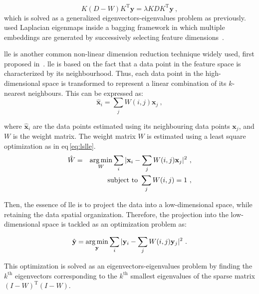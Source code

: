 \begin{equation}
  K (D-W) K^{\text{T}} \mathbf{y} = \lambda K D K^{\text{T}} \mathbf{y} \ ,
  \label{eq:sesmik}
\end{equation}
\noindent which is solved as a generalized eigenvectors-eigenvalues problem as previously.
\citeauthor{Viswanath2011} used Laplacian eigenmaps inside a bagging framework in which multiple embeddings are generated by successively selecting feature dimensions~\cite{Viswanath2011}.

\Ac{lle} is another common non-linear dimension reduction technique widely used, first proposed in~\cite{Roweis2000}.
\ac{lle} is based on the fact that a data point in the feature space is characterized by its neighbourhood.
Thus, each data point in the high-dimensional space is transformed to represent a linear combination of its $k$-nearest neighbours.
This can be expressed as:
\begin{equation}
	\hat{\mathbf{x}}_i = \sum_j W(i,j) \mathbf{x}_j \ ,
	\label{eq:lincomlle}
\end{equation}

\noindent where $\hat{\mathbf{x}}_i$ are the data points estimated using its neighbouring data points $\mathbf{x}_j$, and $W$ is the weight matrix.
The weight matrix $W$ is estimated using a least square optimization as in \acs{eq}\,\eqref{eq:lslle}.
\begin{eqnarray}
	\hat{W} & = & \operatorname*{arg\,min}_{W} \sum_i | \mathbf{x}_i - \sum_j W(i,j)\mathbf{x}_j |^{2} \ , \label{eq:lslle} \\
	&& \text{subject to } \sum_j W(i,j) = 1 \ , \nonumber
\end{eqnarray}

Then, the essence of \ac{lle} is to project the data into a low-dimensional space, while retaining the data spatial organization.
Therefore, the projection into the low-dimensional space is tackled as an optimization problem as:

\begin{equation}
	\hat{\mathbf{y}} = \operatorname*{arg\,min}_{\mathbf{y}} \sum_i | \mathbf{y}_i - \sum_j W(i,j)\mathbf{y}_j |^{2} \ .
	\label{eq:lowprojlle}
\end{equation}

This optimization is solved as an eigenvectors-eigenvalues problem by finding the $k^{\text{th}}$ eigenvectors corresponding to the $k^{\text{th}}$ smallest eigenvalues of the sparse matrix $(I-W)^{\text{T}}(I-W)$.

